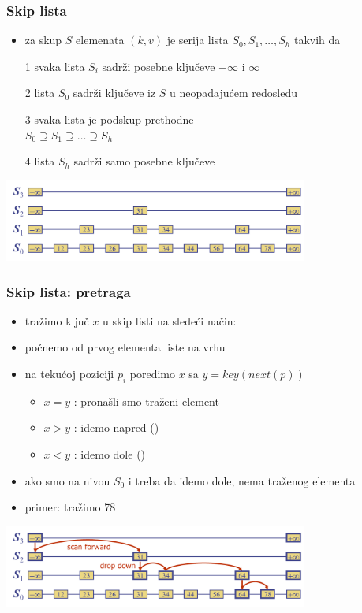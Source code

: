 \documentclass[compress,aspectratio=169]{beamer}
\begin{document}
\begin{frame}[fragile]
  \frametitle{Skip lista}
  \begin{itemize}
    \item {} za skup $S$ elemenata $(k, v)$ je serija lista $S_0, S_1, \ldots, S_h$ takvih da
    \item[1] svaka lista $S_i$ sadrži posebne ključeve $-\infty$ i $\infty$
    \item[2] lista $S_0$ sadrži ključeve iz $S$ u neopadajućem redosledu
    \item[3] svaka lista je podskup prethodne \\
    $S_0 \supseteq S_1 \supseteq \ldots \supseteq S_h$
    \item[4] lista $S_h$ sadrži samo posebne ključeve 
  \end{itemize}
  \begin{center}
    \includegraphics[width=10cm]{asp-10-pic11.png}
  \end{center}
\end{frame}

\begin{frame}[fragile]
  \frametitle{Skip lista: pretraga}
  \begin{itemize}
    \item tražimo ključ $x$ u skip listi na sledeći način:
    \item počnemo od prvog elementa liste na vrhu
    \item na tekućoj poziciji $p_i$ poredimo $x$ sa $y = key(next(p))$
    \begin{itemize}
      \item $x = y$ : pronašli smo traženi element
      \item $x > y$ : idemo napred ()
      \item $x < y$ : idemo dole ()
    \end{itemize}
    \item ako smo na nivou $S_0$ i treba da idemo dole, nema traženog elementa
    \item primer: tražimo 78
  \end{itemize}
  \begin{center}
    \includegraphics[width=10cm]{asp-10-pic12.png}
  \end{center}
\end{frame}
\end{document}
